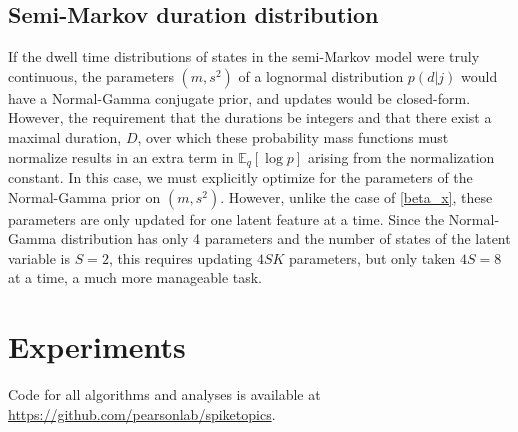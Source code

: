 \documentclass[10pt,letterpaper]{article}
\begin{document}
\subsection{Semi-Markov duration distribution}
\label{semimarkovdd}
If the dwell time distributions of states in the semi-Markov model were truly continuous, the parameters $(m, s^2)$ of a lognormal distribution $p(d|j)$ would have a Normal-Gamma conjugate prior, and updates would be closed-form. However, the requirement that the durations be integers and that there exist a maximal duration, $D$, over which these probability mass functions must normalize results in an extra term in $\mathbb{E}_q[\log p]$ arising from the normalization constant. In this case, we must explicitly optimize for the parameters of the Normal-Gamma prior on $(m, s^2)$. However, unlike the case of \ref{beta_x}, these parameters are only updated for one latent feature at a time. Since the Normal-Gamma distribution has only 4 parameters and the number of states of the latent variable is $S = 2$, this requires updating $4SK$ parameters, but only taken $4S = 8$ at a time, a much more manageable task.



\section{Experiments}
Code for all algorithms and analyses is available at \url{https://github.com/pearsonlab/spiketopics}.


\nolinenumbers
\newpage
%
%
%

%
%

{}
\end{document}
